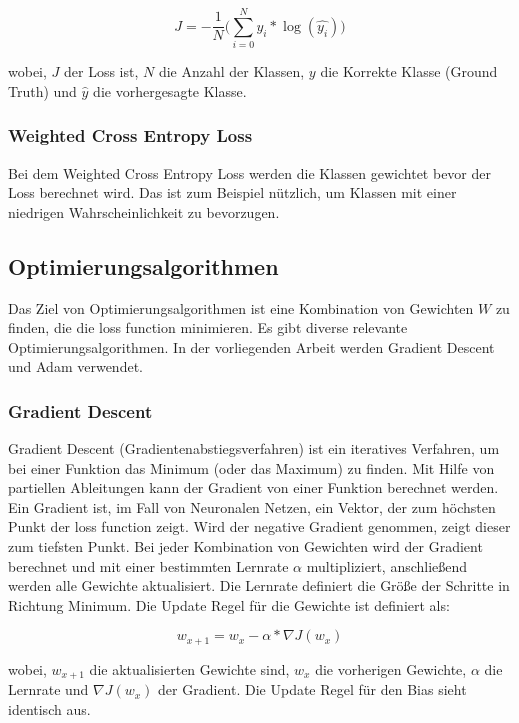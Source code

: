 \begin{equation}
  J = -\frac{1}{N} \Big(\sum_{i=0}^N y_{i} * \log(\hat{y_{i}})\Big)
\end{equation}

wobei, $J$ der Loss ist, $N$ die Anzahl der Klassen, $y$ die Korrekte Klasse (Ground Truth) und $ \hat{y}$ die vorhergesagte Klasse.

\subsubsection{Weighted Cross Entropy Loss}
Bei dem Weighted Cross Entropy Loss werden die Klassen gewichtet bevor der Loss berechnet wird. Das ist zum Beispiel nützlich, um Klassen  
mit einer niedrigen Wahrscheinlichkeit zu bevorzugen.

\subsection{Optimierungsalgorithmen}
Das Ziel von Optimierungsalgorithmen ist eine Kombination von Gewichten $ W $ zu finden, die die \gls{loss function} minimieren.
Es gibt diverse relevante Optimierungsalgorithmen. In der vorliegenden Arbeit werden Gradient Descent und Adam verwendet.

\subsubsection{Gradient Descent}
Gradient Descent (Gradientenabstiegsverfahren) ist ein iteratives Verfahren, um bei einer Funktion das Minimum (oder das Maximum) zu finden. 
Mit Hilfe von partiellen Ableitungen kann der Gradient von einer Funktion berechnet werden. Ein Gradient ist, im Fall von Neuronalen
Netzen, ein Vektor, der zum höchsten Punkt der \gls{loss function} zeigt. Wird der negative Gradient genommen, zeigt dieser zum tiefsten Punkt.
Bei jeder Kombination von Gewichten wird der Gradient berechnet und mit einer bestimmten Lernrate $ \alpha $ multipliziert, anschließend werden 
alle Gewichte aktualisiert. Die Lernrate definiert die Größe der Schritte in Richtung Minimum. Die Update Regel für die Gewichte ist definiert als:

\begin{equation}
  w_{x+1} = w_x - \alpha * \nabla J(w_x)
\end{equation}

wobei, $w_{x+1}$ die aktualisierten Gewichte sind, $w_x$ die vorherigen Gewichte, $ \alpha $ die Lernrate und $\nabla J(w_x)$ der Gradient. 
Die Update Regel für den Bias sieht identisch aus.

